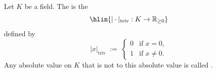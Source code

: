 \begin{definition} \label{definition:trivial_absolute_value_on_a_field}
Let $K$ be a field. The  is the 
$$\hlin{|\cdot|_{\mathrm{triv}} : K \to \mathbb{R}_{\geq 0}}$$
defined by
\[
|x|_{\mathrm{triv}} \;:=\; \begin{cases}
0 & \text{if } x = 0, \\
1 & \text{if } x \neq 0.
\end{cases}
\]
Any absolute value on $K$ that is not  to this absolute value is called . 
\end{definition}
